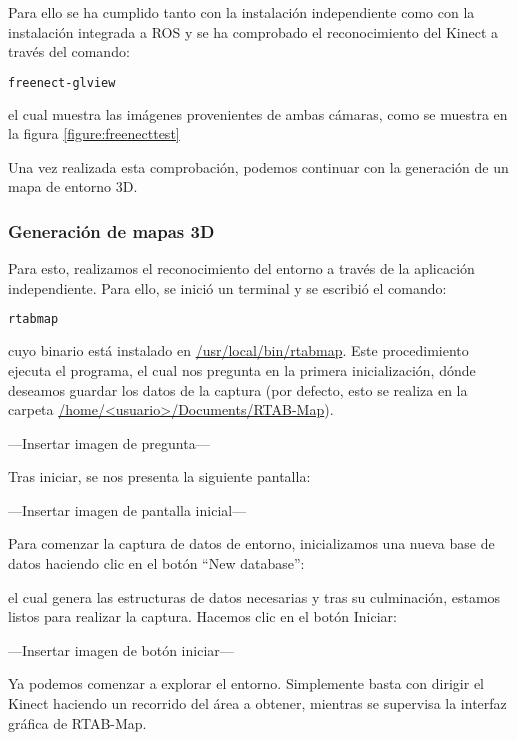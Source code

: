 Para ello se ha cumplido tanto con la instalación independiente como con la instalación integrada a ROS y se ha comprobado el reconocimiento del Kinect a través del comando:

\begin{blackcodebox}
\begin{lstlisting}[language=bash]
freenect-glview
\end{lstlisting}
\end{blackcodebox}

el cual muestra las imágenes provenientes de ambas cámaras, como se muestra en la figura \ref{figure:freenecttest}

Una vez realizada esta comprobación, podemos continuar con la generación de un mapa de entorno 3D.

\subsubsection{Generación de mapas 3D}

Para esto, realizamos el reconocimiento del entorno a través de la aplicación independiente. Para ello, se inició un terminal y se escribió el comando:

\begin{blackcodebox}
\begin{lstlisting}[language=bash]
rtabmap
\end{lstlisting}
\end{blackcodebox}

cuyo binario está instalado en \url{/usr/local/bin/rtabmap}. Este procedimiento ejecuta el programa, el cual nos pregunta en la primera inicialización, dónde deseamos guardar los datos de la captura (por defecto, esto se realiza en la carpeta \url{/home/<usuario>/Documents/RTAB-Map}).

---Insertar imagen de pregunta---

Tras iniciar, se nos presenta la siguiente pantalla:

---Insertar imagen de pantalla inicial---

Para comenzar la captura de datos de entorno, inicializamos una nueva base de datos haciendo clic en el botón ``New database'':

el cual genera las estructuras de datos necesarias y tras su culminación, estamos listos para realizar la captura. Hacemos clic en el botón Iniciar:

---Insertar imagen de botón iniciar---

Ya podemos comenzar a explorar el entorno. Simplemente basta con dirigir el Kinect haciendo un recorrido del área a obtener, mientras se supervisa la interfaz gráfica de RTAB-Map.

